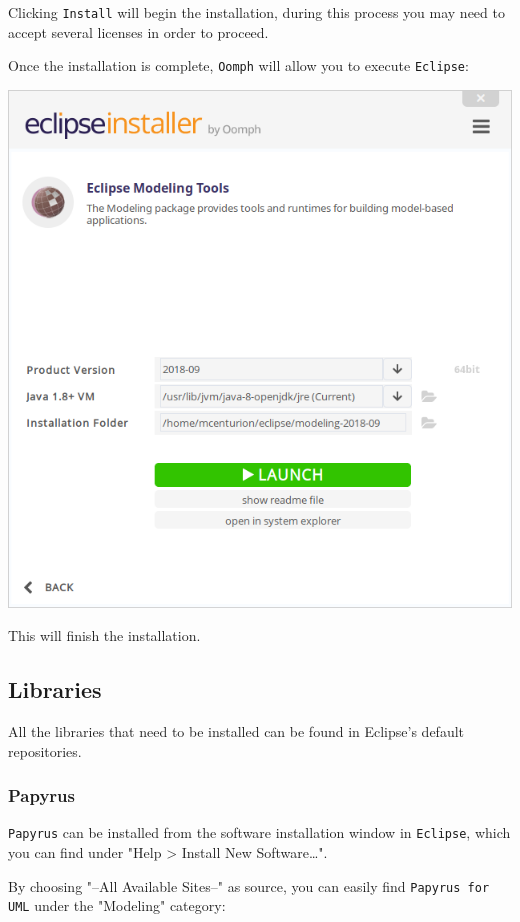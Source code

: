 \documentclass[11pt]{article}
\begin{document}
Clicking \texttt{Install} will begin the installation, during this process you may need to accept several licenses in order to proceed.

Once the installation is complete, \texttt{Oomph} will allow you to execute \texttt{Eclipse}:

\begin{center}
\includegraphics[width=.9\linewidth]{images/oomph_launch.png}
\end{center}

This will finish the installation.

\subsection{Libraries}
\label{sec:org82d9ff1}

All the libraries that need to be installed can be found in Eclipse's default repositories. 

\subsubsection{Papyrus}
\label{sec:orgedb7b37}

\texttt{Papyrus} can be installed from the software installation window in \texttt{Eclipse}, which you can find under "Help > Install New Software\ldots{}".

By choosing "--All Available Sites--" as source, you can easily find \texttt{Papyrus for UML} under the "Modeling" category:
\end{document}
